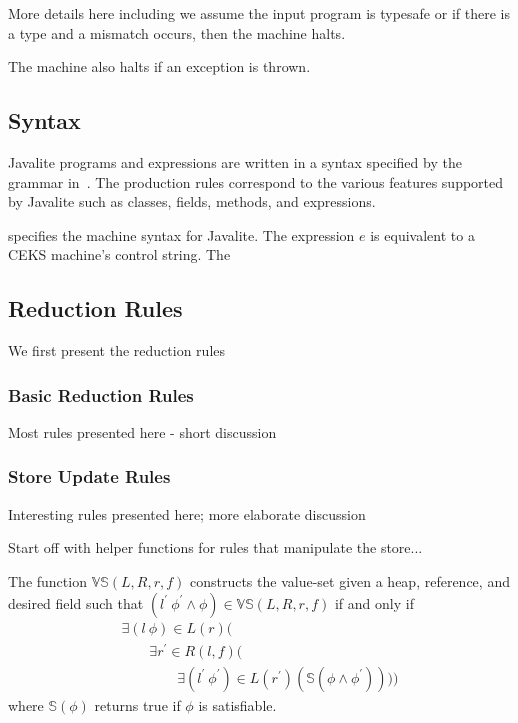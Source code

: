 More details here including we assume the input program is typesafe
or if there is a type and a mismatch occurs, then the machine halts.

The machine also halts if an exception is thrown.

\subsection{Syntax}

Javalite programs and expressions are written in a syntax specified by the 
grammar in~. The production rules correspond
to the various features supported by Javalite such as classes, fields,
methods, and expressions. 

 specifies
the machine syntax for Javalite. The expression $e$ is equivalent to
a CEKS machine's control string. The 

\subsection{Reduction Rules}

We first present the reduction rules 


\subsubsection{Basic Reduction Rules}

Most rules presented here - short discussion

\subsubsection{Store Update Rules}

Interesting rules presented here; more elaborate discussion

Start off with helper functions for rules that manipulate the store...

The function $\mathbb{VS}(L,R,r,f)$ constructs the value-set given a
heap, reference, and desired field such that
$(l^\prime\ \phi^\prime\wedge\phi) \in \mathbb{VS}(L,R,r,f)$ if and
only if
\[
\begin{array}{l}
  \exists (l\ \phi) \in L(r) ( \\
  \ \ \ \ \ \ \ \ \ \exists r^\prime \in R(l,f) ( \\
  \ \ \ \ \ \ \ \ \ \ \ \ \ \ \ \ \ \ \exists (l^\prime\ \phi^\prime) \in L(r^\prime) (\mathbb{S}(\phi\wedge\phi^\prime))))
\end{array}
\]
where $\mathbb{S}(\phi)$ returns true if $\phi$ is satisfiable.


